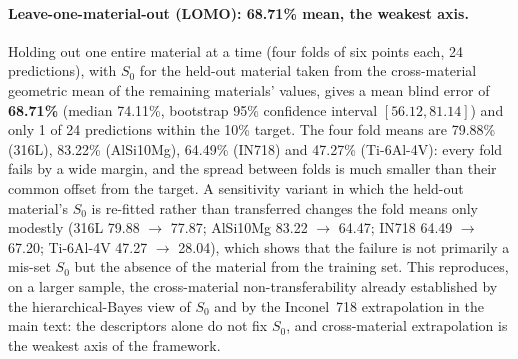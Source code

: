 \documentclass[11pt,a4paper,twocolumn]{article}
\begin{document}
\paragraph{Leave-one-material-out (LOMO): 68.71\% mean, the weakest axis.}
Holding out one entire material at a time (four folds of six points each, 24 predictions), with $S_0$ for
the held-out material taken from the cross-material geometric mean of the remaining materials' values,
gives a mean blind error of \textbf{68.71\%} (median 74.11\%, bootstrap 95\% confidence interval
$[56.12, 81.14]$) and only 1 of 24 predictions within the 10\% target. The four fold means are 79.88\%
(316L), 83.22\% (AlSi10Mg), 64.49\% (IN718) and 47.27\% (Ti-6Al-4V): every fold fails by a wide margin,
and the spread between folds is much smaller than their common offset from the target. A sensitivity
variant in which the held-out material's $S_0$ is re-fitted rather than transferred changes the fold
means only modestly (316L 79.88 $\to$ 77.87; AlSi10Mg 83.22 $\to$ 64.47; IN718 64.49 $\to$ 67.20;
Ti-6Al-4V 47.27 $\to$ 28.04), which shows that the failure is not primarily a mis-set $S_0$ but the
absence of the material from the training set. This reproduces, on a larger sample, the cross-material
non-transferability already established by the hierarchical-Bayes view of $S_0$ and by the Inconel~718
extrapolation in the main text: the descriptors alone do not fix $S_0$, and cross-material extrapolation
is the weakest axis of the framework.
\end{document}
